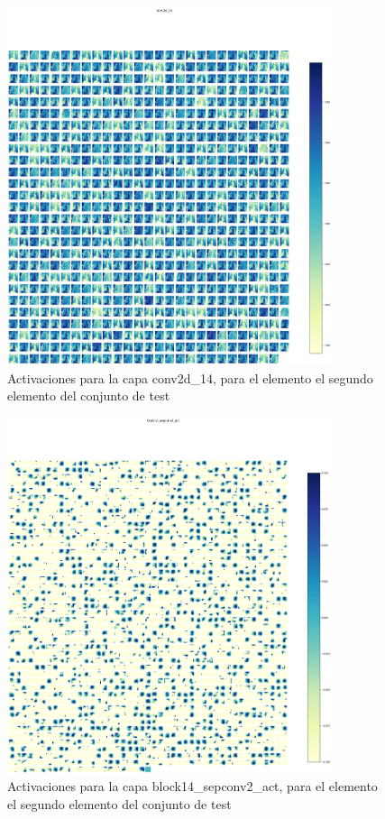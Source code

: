 \documentclass[11pt,a4paper]{article}
\theoremstyle{definition}
\begin{document}
\begin{figure}[]
\centering
\includegraphics[width=0.85\textwidth]{./images/actmap3.png}
\caption{Activaciones para la capa conv2d\_14, para el elemento el segundo elemento del conjunto de test}
\end{figure}

\begin{figure}[]
\centering
\includegraphics[width=0.85\textwidth]{./images/actmap4.png}
\caption{Activaciones para la capa block14\_sepconv2\_act, para el elemento el segundo elemento del conjunto de test}
\end{figure}
\end{document}
